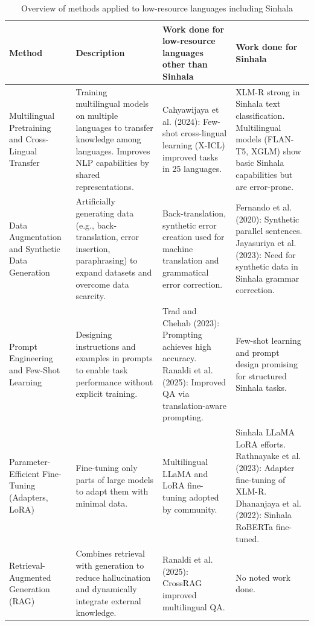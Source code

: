 \documentclass[12pt]{uomthesis}
\begin{document}
\begin{table}[h!]
\centering
\small
\begin{tabularx}{\linewidth}{@{}>{\raggedright\arraybackslash}p{2.5cm}>{\raggedright\arraybackslash}X>{\raggedright\arraybackslash}p{3.8cm}>{\raggedright\arraybackslash}p{3.8cm}@{}}
\toprule
\textbf{Method} & \textbf{Description} & \textbf{Work done for low-resource languages other than Sinhala} & \textbf{Work done for Sinhala} \\
\midrule
Multilingual Pretraining and Cross-Lingual Transfer &
Training multilingual models on multiple languages to transfer knowledge among languages. Improves NLP capabilities by shared representations. &
Cahyawijaya et al. (2024): Few-shot cross-lingual learning (X-ICL) improved tasks in 25 languages. &
XLM-R strong in Sinhala text classification. Multilingual models (FLAN-T5, XGLM) show basic Sinhala capabilities but are error-prone. \\
\midrule
Data Augmentation and Synthetic Data Generation &
Artificially generating data (e.g., back-translation, error insertion, paraphrasing) to expand datasets and overcome data scarcity. &
Back-translation, synthetic error creation used for machine translation and grammatical error correction. &
Fernando et al. (2020): Synthetic parallel sentences. Jayasuriya et al. (2023): Need for synthetic data in Sinhala grammar correction. \\
\midrule
Prompt Engineering and Few-Shot Learning &
Designing instructions and examples in prompts to enable task performance without explicit training. &
Trad and Chehab (2023): Prompting achieves high accuracy. Ranaldi et al. (2025): Improved QA via translation-aware prompting. &
Few-shot learning and prompt design promising for structured Sinhala tasks. \\
\midrule
Parameter-Efficient Fine-Tuning (Adapters, LoRA) &
Fine-tuning only parts of large models to adapt them with minimal data. &
Multilingual LLaMA and LoRA fine-tuning adopted by community. &
Sinhala LLaMA LoRA efforts. Rathnayake et al. (2023): Adapter fine-tuning of XLM-R. Dhananjaya et al. (2022): Sinhala RoBERTa fine-tuned. \\
\midrule
Retrieval-Augmented Generation (RAG) &
Combines retrieval with generation to reduce hallucination and dynamically integrate external knowledge. &
Ranaldi et al. (2025): CrossRAG improved multilingual QA. &
No noted work done. \\
\bottomrule
\end{tabularx}
\caption{Overview of methods applied to low-resource languages including Sinhala}
\label{tab:low_resource_methods}
\end{table}
\end{document}
